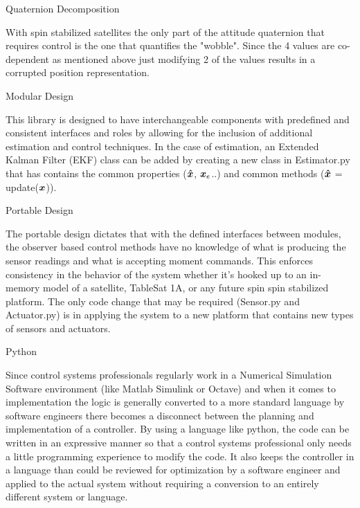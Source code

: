 Quaternion Decomposition

With spin stabilized satellites the only part of the attitude quaternion that requires control is the one that quantifies the "wobble". Since the 4 values are co-dependent as mentioned above just modifying 2 of the values results in a corrupted position representation.

Modular Design

This library is designed to have interchangeable components with predefined and consistent interfaces and roles by allowing for the inclusion of additional estimation and control techniques. In the case of estimation, an Extended Kalman Filter (EKF) class can be added by creating a new class in Estimator.py that has contains the common properties ($\boldsymbol{\hat{x}}$, $\boldsymbol{x}_e$..) and common methods ($\boldsymbol{\hat{x}}$ = update($\boldsymbol{x}$)).

Portable Design

The portable design dictates that with the defined interfaces between modules, the observer based control methods have no knowledge of what is producing the sensor readings and what is accepting moment commands. This enforces consistency in the behavior of the system whether it's hooked up to an in-memory model of a satellite, TableSat 1A, or any future spin spin stabilized platform. The only code change that may be required (Sensor.py and Actuator.py) is in applying the system to a new platform that contains new types of sensors and actuators.

Python

Since control systems professionals regularly work in a Numerical Simulation Software environment (like Matlab Simulink or Octave) and when it comes to implementation the logic is generally converted to a more standard language by software engineers there becomes a disconnect between the planning and implementation of a controller. By using a language like python, the code can be written in an expressive manner so that a control systems professional only needs a little programming experience to modify the code. It also keeps the controller in a language than could be reviewed for optimization by a software engineer and applied to the actual system without requiring a conversion to an entirely different system or language.
